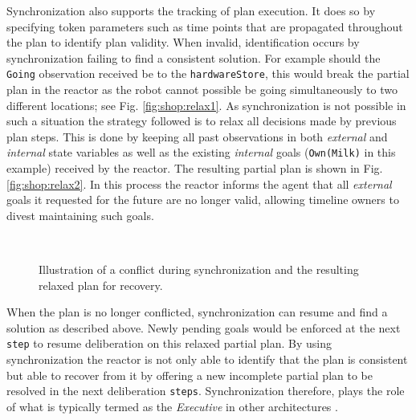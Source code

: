 Synchronization also supports the tracking of plan execution. It does
so by specifying token parameters such as time points that are
propagated throughout the plan to identify plan validity.
When invalid, identification occurs by synchronization failing to find
a consistent solution. For example should the \texttt{Going}
observation received be to the \texttt{hardwareStore}, this would
break the partial plan in the reactor as the robot cannot possible be
going simultaneously to two different locations; see Fig.
\ref{fig:shop:relax1}. As synchronization is not possible in such a
situation the strategy followed is to relax all decisions made by
previous plan steps. This is done by keeping all past observations in
both {\em external} and {\em internal} state variables as well as the
existing {\em internal} goals (\texttt{Own(Milk)} in this example)
received by the reactor. The resulting partial plan is shown in Fig.
\ref{fig:shop:relax2}. In this process the reactor informs the agent
that all {\em external} goals it requested for the future are no
longer valid, allowing timeline owners to divest maintaining such
goals.

\begin{figure}[!htbp]
  \centering
  \\
  \caption{\small Illustration of a conflict during synchronization
    and the resulting relaxed plan for recovery.}
\end{figure}

When the plan is no longer conflicted, synchronization can resume and
find a solution as described above. Newly pending goals would be
enforced at the next \texttt{step} to resume deliberation on this
relaxed partial plan. By using synchronization the reactor is not only
able to identify that the plan is consistent but able to recover from
it by offering a new incomplete partial plan to be resolved in the
next deliberation \texttt{steps}. %
Synchronization therefore, plays the role of what is typically termed
as the {\em Executive} in other architectures \cite{gat98,
  alami:1998p820, mus98, williams03, Nesnas:2003do}.

